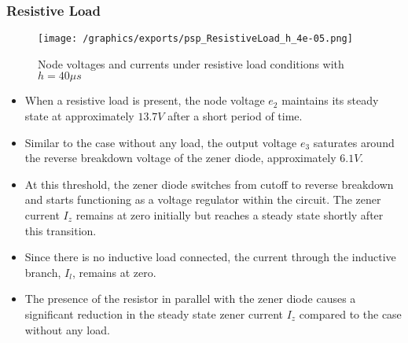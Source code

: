 \subsubsection{Resistive Load}
\begin{figure}[H]
    \centering
    \texttt{[image: /graphics/exports/psp\_ResistiveLoad\_h\_4e-05.png]}
    \caption{Node voltages and currents under resistive load conditions with $h=40\mu s$}
\end{figure}
\begin{itemize}
\item When a resistive load is present, the node voltage $e_2$ maintains its steady state at approximately $13.7V$ after a short period of time.
\item Similar to the case without any load, the output voltage $e_3$ saturates around the reverse breakdown voltage of the zener diode, approximately $6.1V$.
\item At this threshold, the zener diode switches from cutoff to reverse breakdown and starts functioning as a voltage regulator within the circuit. The zener current $I_z$ remains at zero initially but reaches a steady state shortly after this transition.
\item Since there is no inductive load connected, the current through the inductive branch, $I_l$, remains at zero.
\item The presence of the resistor in parallel with the zener diode causes a significant reduction in the steady state zener current $I_z$ compared to the case without any load.
\end{itemize}


